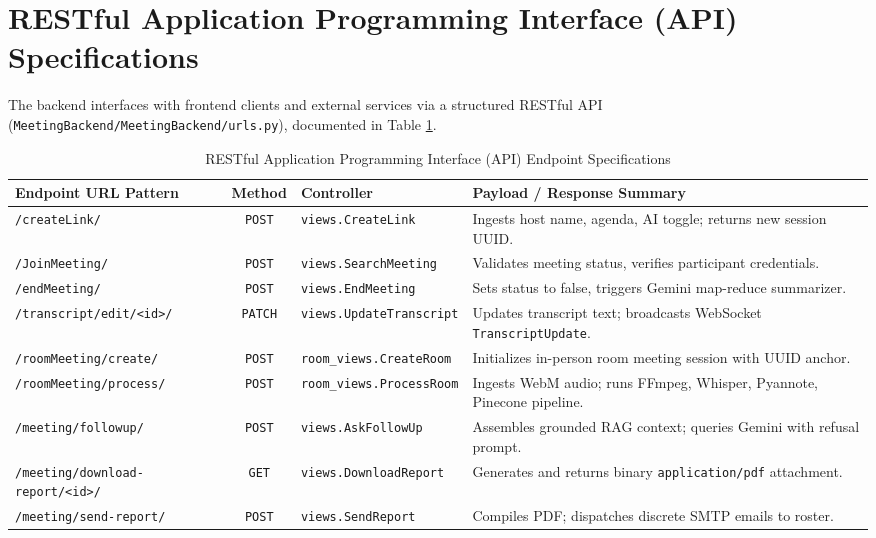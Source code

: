 \documentclass[12pt,oneside,letterpaper]{report}
\numberwithin{equation}{chapter} %
\begin{document}
\section{RESTful Application Programming Interface (API) Specifications}
The backend interfaces with frontend clients and external services via a structured RESTful API (\texttt{MeetingBackend/MeetingBackend/urls.py}), documented in Table \ref{tab:api_specs}.

\begin{table}[H]
\centering
\caption{RESTful Application Programming Interface (API) Endpoint Specifications}
\label{tab:api_specs}
\footnotesize
\begin{tabularx}{\textwidth}{p{4.2cm}c p{3.2cm}X}
\toprule
\textbf{Endpoint URL Pattern} & \textbf{Method} & \textbf{Controller} & \textbf{Payload / Response Summary} \\
\midrule
\texttt{/createLink/} & \texttt{POST} & \texttt{views.CreateLink} & Ingests host name, agenda, AI toggle; returns new session UUID. \\
\addlinespace
\texttt{/JoinMeeting/} & \texttt{POST} & \texttt{views.SearchMeeting} & Validates meeting status, verifies participant credentials. \\
\addlinespace
\texttt{/endMeeting/} & \texttt{POST} & \texttt{views.EndMeeting} & Sets status to false, triggers Gemini map-reduce summarizer. \\
\addlinespace
\texttt{/transcript/edit/<id>/} & \texttt{PATCH} & \texttt{views.UpdateTranscript} & Updates transcript text; broadcasts WebSocket \texttt{TranscriptUpdate}. \\
\addlinespace
\texttt{/roomMeeting/create/} & \texttt{POST} & \texttt{room\_views.CreateRoom} & Initializes in-person room meeting session with UUID anchor. \\
\addlinespace
\texttt{/roomMeeting/process/} & \texttt{POST} & \texttt{room\_views.ProcessRoom} & Ingests WebM audio; runs FFmpeg, Whisper, Pyannote, Pinecone pipeline. \\
\addlinespace
\texttt{/meeting/followup/} & \texttt{POST} & \texttt{views.AskFollowUp} & Assembles grounded RAG context; queries Gemini with refusal prompt. \\
\addlinespace
\texttt{/meeting/download-report/<id>/} & \texttt{GET} & \texttt{views.DownloadReport} & Generates and returns binary \texttt{application/pdf} attachment. \\
\addlinespace
\texttt{/meeting/send-report/} & \texttt{POST} & \texttt{views.SendReport} & Compiles PDF; dispatches discrete SMTP emails to roster. \\
\bottomrule
\end{tabularx}
\end{table}
\end{document}
